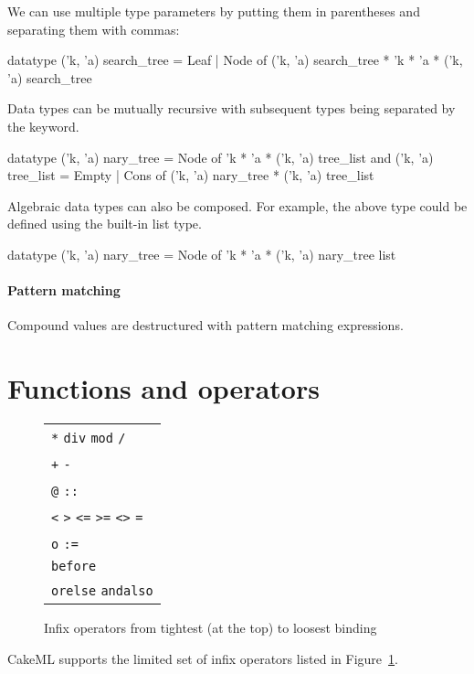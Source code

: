 \documentclass[12pt,a4paper]{book}
\begin{document}
We can use multiple type parameters by putting them in parentheses and separating them with commas:
\begin{smlcode}
datatype ('k, 'a) search_tree =
  Leaf
| Node of ('k, 'a) search_tree * 'k * 'a * ('k, 'a) search_tree
\end{smlcode}

Data types can be mutually recursive with subsequent types being separated by
the  keyword.
\begin{smlcode}
datatype ('k, 'a) nary_tree =
  Node of 'k * 'a * ('k, 'a) tree_list
and ('k, 'a) tree_list =
  Empty
| Cons of ('k, 'a) nary_tree * ('k, 'a) tree_list
\end{smlcode}

Algebraic data types can also be composed. For example, the above
 type could be defined using the built-in list type.
\begin{smlcode}
datatype ('k, 'a) nary_tree =
  Node of 'k * 'a * ('k, 'a) nary_tree list
\end{smlcode}

\paragraph{Pattern matching}
Compound values are destructured with pattern matching  expressions.

\section{Functions and operators}
\label{sect:func}

\begin{figure}
\centering
\begin{tabular}{l}
 \texttt{*} \texttt{div} \texttt{mod} \texttt{/}\\
 \texttt{+} \texttt{-}\\
 \texttt{@} \texttt{::}\\
 \texttt{<} \texttt{>} \texttt{<=} \texttt{>=} \texttt{<>} \texttt{=}\\
 \texttt{o} \texttt{:=}\\
 \texttt{before}\\
 \texttt{orelse} \texttt{andalso}
 \end{tabular}
\caption{Infix operators from tightest (at the top) to loosest binding}
\label{precedences}
\end{figure}

CakeML supports the limited set of infix operators listed in Figure~\ref{precedences}.
\end{document}
